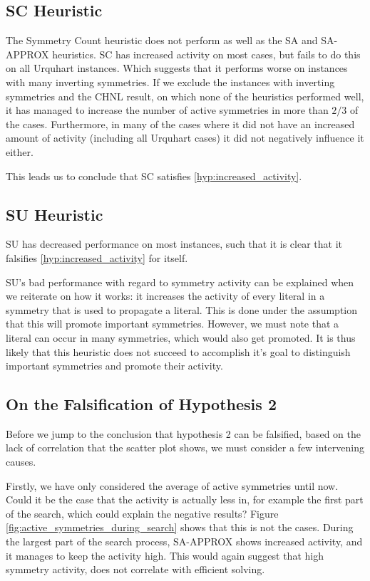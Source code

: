 \subsection{SC Heuristic}
	The Symmetry Count heuristic does not perform as well as the SA and SA-APPROX heuristics.
	SC has increased activity on most cases, but fails to do this on all Urquhart instances.
	Which suggests that it performs worse on instances with many inverting symmetries.
	If we exclude the instances with inverting symmetries and the CHNL result, on which none of the
	heuristics performed well, it has managed to increase the number of active symmetries in more
	than $2/3$ of the cases.
	Furthermore, in many of the cases where it did not have an increased amount of activity
	(including all Urquhart cases) it did not negatively influence it either.

	This leads us to conclude that SC satisfies \cref{hyp:increased_activity}.

\subsection{SU Heuristic}
	SU has decreased performance on most instances, such that it is clear that it falsifies
	\cref{hyp:increased_activity} for itself.

	SU's bad performance with regard to symmetry activity can be explained when we reiterate on
	how it works: it increases the activity of every literal in a symmetry that is used to propagate
	a literal.
	This is done under the assumption that this will promote important symmetries.
	However, we must note that a literal can occur in many symmetries, which would also get
	promoted.
	It is thus likely that this heuristic does not succeed to accomplish it's goal to distinguish
	important symmetries and promote their activity.

\subsection{On the Falsification of Hypothesis 2}
\label{ssec:falsification_hyp_2}

	Before we jump to the conclusion that hypothesis 2 can be falsified, based on the lack of
	correlation that the scatter plot shows, we must consider a few intervening causes.

	Firstly, we have only considered the average of active symmetries until now.
	Could it be the case that the activity is actually less in, for example the first part of the
	search, which could explain the negative results?
	Figure \ref{fig:active_symmetries_during_search} shows that this is not the cases.
	During the largest part of the search process, SA-APPROX shows increased activity, and it
	manages to keep the activity high.
	This would again suggest that high symmetry activity, does not correlate with efficient solving.

